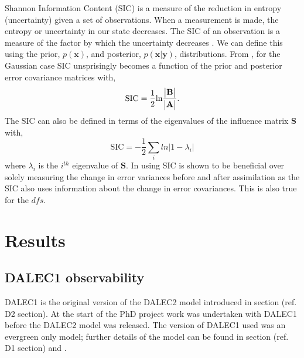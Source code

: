 \documentclass[11pt]{article}
\begin{document}
Shannon Information Content (SIC) is a measure of the reduction in entropy (uncertainty) given a set of observations. When a measurement is made, the entropy or uncertainty in our state decreases. The SIC of an observation is a measure of the factor by which the uncertainty decreases \citep{cover1991elements}. We can define this using the prior, $p(\textbf{x})$, and posterior, $p(\textbf{x}|\textbf{y})$, distributions. From \citet{rodgers2000inverse}, for the Gaussian case SIC unsprisingly becomes a function of the prior and posterior error covariance matrices with,
\begin{equation}
\text{SIC}=\frac{1}{2}\text{ln}\frac{\begin{vmatrix} \bf{B} \end{vmatrix}}{\begin{vmatrix} \bf{A} \end{vmatrix}}. \label{eqn:sic}
\end{equation}
The SIC can also be defined in terms of the eigenvalues of the influence matrix $\textbf{S}$ with,
\begin{equation}
\text{SIC} = -\frac{1}{2} \sum_{i} ln | 1 - \lambda_{i} |
\end{equation}
where $\lambda_{i}$ is the $i^{th}$ eigenvalue of $\textbf{S}$. In \citet{eyre1990information} using SIC is shown to be beneficial over solely measuring the change in error variances before and after assimilation as the SIC also uses information about the change in error covariances. This is also true for the $dfs$.   

\section{Results}

\subsection{DALEC1 observability} \label{sec:D1observability}

DALEC1 is the original version of the DALEC2 model introduced in section ({\color{red}ref. D2 section}). At the start of the PhD project work was undertaken with DALEC1 before the DALEC2 model was released. The version of DALEC1 used was an evergreen only model; further details of the model can be found in section ({\color{red}ref. D1 section}) and \citet{williams2005improved}. 
\end{document}
